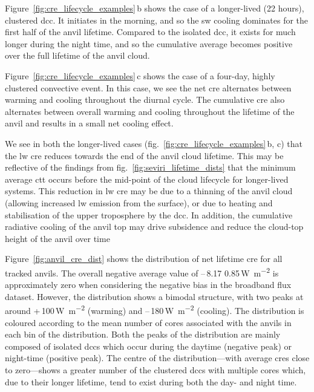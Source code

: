 \documentclass[acp, manuscript]{copernicus}
\begin{document}
Figure~\ref{fig:cre_lifecycle_examples}\,b shows the case of a longer-lived (22 hours), clustered \acrshort{dcc}. 
It initiates in the morning, and so the \acrshort{sw} cooling dominates for the first half of the anvil lifetime. 
Compared to the isolated \acrshort{dcc}, it exists for much longer during the night time, and so the cumulative average becomes positive over the full lifetime of the anvil cloud.

Figure~\ref{fig:cre_lifecycle_examples}\,c shows the case of a four-day, highly clustered convective event. 
In this case, we see the net \acrshort{cre} alternates between warming and cooling throughout the diurnal cycle. 
The cumulative \acrshort{cre} also alternates between overall warming and cooling throughout the lifetime of the anvil and results in a small net cooling effect.

We see in both the longer-lived cases (fig.~\ref{fig:cre_lifecycle_examples}\,b, c) that the \acrshort{lw} \acrshort{cre} reduces towards the end of the anvil cloud lifetime. 
This may be reflective of the findings from fig.~\ref{fig:seviri_lifetime_dists} that the minimum average \acrshort{ctt} occurs before the mid-point of the cloud lifecycle for longer-lived systems. 
This reduction in \acrshort{lw} \acrshort{cre} may be due to a thinning of the anvil cloud (allowing increased \acrshort{lw} emission from the surface), or due to heating and stabilisation of the upper troposphere by the \acrshort{dcc}.
In addition, the cumulative radiative cooling of the anvil top may drive subsidence and reduce the cloud-top height of the anvil over time \citep{sokol_tropical_2020}

Figure~\ref{fig:anvil_cre_dist} shows the distribution of net lifetime \acrshort{cre} for all tracked anvils. 
The overall negative average value of --\,8.17\,\textpm\,0.85\,\unit{W m^{-2}} is approximately zero when considering the negative bias in the broadband flux dataset. 
However, the distribution shows a bimodal structure, with two peaks at around +\,100\,\unit{W m^{-2}} (warming) and --\,180\,\unit{W m^{-2}} (cooling). 
The distribution is coloured according to the mean number of cores associated with the anvils in each bin of the distribution. 
Both the peaks of the distribution are mainly composed of isolated \acrshort{dcc}s which occur during the daytime (negative peak) or night-time (positive peak). 
The centre of the distribution---with average \acrshort{cre}s close to zero---shows a greater number of the clustered \acrshort{dcc}s with multiple cores which, due to their longer lifetime, tend to exist during both the day- and night time.
\end{document}
